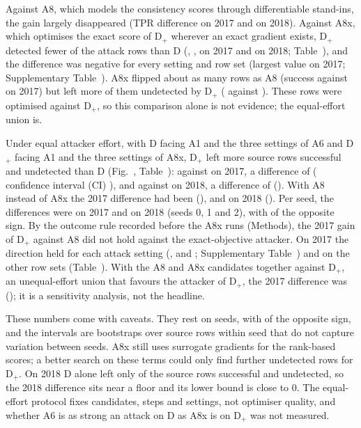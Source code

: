 Against A8, which models the consistency scores through differentiable stand-ins, the gain largely disappeared (TPR
difference \tprAeightOneVoneSeventeen{} on 2017 and \tprAeightOneVoneEighteen{} on 2018).
Against A8x, which optimises the exact score of D$_+$ wherever an exact gradient exists, D$_+$ detected fewer of the
attack rows than D (\xtprAxOneVoneSeventeen{}, \xtprAxOneVoneSeventeenCI, on 2017 and \xtprAxOneVoneEighteen{} on
2018; Table~\mainTabAttacks), and the difference was negative for every setting and row set (largest value
\xtprAxMaxSeventeen{} on 2017; Supplementary Table~\suppTabAxTpr).
A8x flipped about as many rows as A8 (success \xsuccAxOneVoneSeventeen{} against \xsuccAeightOneVoneSeventeen{} on
2017) but left more of them undetected by D$_+$ (\xundetAxOneVoneSeventeen{} against \xundetAeightOneVoneSeventeen).
These rows were optimised against D$_+$, so this comparison alone is not evidence; the equal-effort union is.

Under equal attacker effort, with D facing A1 and the three settings of A6 and D$_+$ facing A1 and the three settings
of A8x, D$_+$ left more source rows successful and undetected than D (Fig.~\mainFigHeadline, Table~\mainTabUnion):
\axHeadVoneSeventeenDplus{} against \axHeadVoneSeventeenD{} on 2017, a difference of \axHeadVoneSeventeen{}
(\paramCILevel{} confidence interval (CI) \axHeadVoneSeventeenCI), and \axHeadVoneEighteenDplus{} against
\axHeadVoneEighteenD{} on 2018, a difference of \axHeadVoneEighteen{} (\axHeadVoneEighteenCI).
With A8 instead of A8x the 2017 difference had been \axStandinVoneSeventeen{} (\axStandinVoneSeventeenCI), and on 2018
\axStandinVoneEighteen{} (\axStandinVoneEighteenCI).
Per seed, the differences were \axHeadVoneSeventeenSeeds{} on 2017 and \axHeadVoneEighteenSeeds{} on 2018
(seeds 0, 1 and 2), with \axHeadOppSeedsPhrase{} of the opposite sign.
By the outcome rule recorded before the A8x runs (Methods), the 2017 gain of D$_+$ against A8 did not hold against the
exact-objective attacker.
On 2017 the direction held for each attack setting (\axLamOneVoneSeventeen, \axLamHundredVoneSeventeen{} and
\axNormVoneSeventeen; Supplementary Table~\suppTabAxSetting) and on the other row sets (Table~\mainTabNeardup).
With the A8 and A8x candidates together against D$_+$, an unequal-effort union that favours the attacker of D$_+$, the
2017 difference was \axSensVoneSeventeen{} (\axSensVoneSeventeenCI); it is a sensitivity analysis, not the headline.

These numbers come with caveats.
They rest on \nSeeds{} seeds, with \axHeadOppSeedsPhrase{} of the opposite sign, and the intervals are bootstraps over
source rows within seed that do not capture variation between seeds.
A8x still uses surrogate gradients for the \nRankScores{} rank-based scores; a better search on these terms could only
find further undetected rows for D$_+$.
On 2018 D alone left only \axHeadVoneEighteenD{} of the source rows successful and undetected, so the 2018 difference
sits near a floor and its lower bound is close to $0$.
The equal-effort protocol fixes candidates, steps and settings, not optimiser quality, and whether A6 is as strong an
attack on D as A8x is on D$_+$ was not measured.

